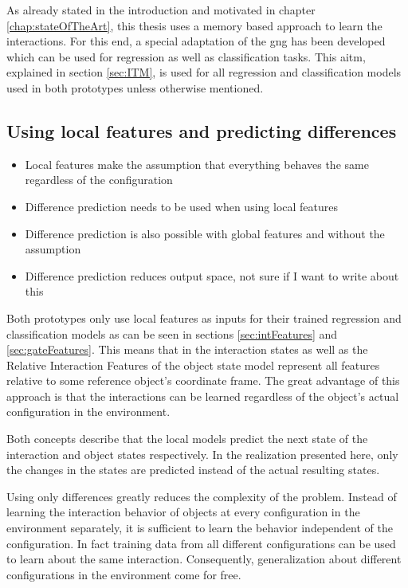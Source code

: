 As already stated in the introduction and motivated in chapter \ref{chap:stateOfTheArt}, this thesis uses a memory based approach to learn the interactions. For this end, a special adaptation of the \gls{gng} has been developed which can be used for regression as well as classification tasks. This \gls{aitm}, explained in section \ref{sec:ITM}, is used for all regression and classification models used in both prototypes unless otherwise mentioned. 

\subsection{Using local features and predicting differences}
\begin{itemize}
\item Local features make the assumption that everything behaves the same regardless of the configuration
\item Difference prediction needs to be used when using local features
\item Difference prediction is also possible with global features and without the assumption
\item Difference prediction reduces output space, not sure if I want to write about this
\end{itemize}
Both prototypes only use local features as inputs for their trained regression and classification models as can be seen in sections \ref{sec:intFeatures} and \ref {sec:gateFeatures}.
This means that in the interaction states as well as the Relative Interaction Features of the object state model represent all features relative to some reference object's coordinate frame. The great advantage of this approach is that the interactions can be learned regardless of the object's actual configuration in the environment. %


Both concepts describe that the local models predict the next state of the interaction and object states respectively. In the realization presented here, only the changes in the states are predicted instead of the actual resulting states. 

Using only differences greatly reduces the complexity of the problem. Instead of learning the interaction behavior of objects at every configuration in the environment separately, it is sufficient to learn the behavior independent of the configuration. In fact training data from all different configurations can be used to learn about the same interaction. Consequently, generalization about different configurations in the environment come for free. 

